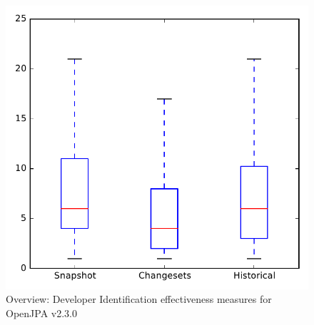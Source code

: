 
\begin{figure}
\centering
\includegraphics[height=0.4\textheight]{figures/dit/all_openjpa_no_outlier}
\caption{Overview: Developer Identification effectiveness measures for OpenJPA v2.3.0}
\label{fig:dit:all:openjpa}
\end{figure}
